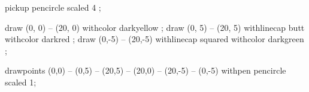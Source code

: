 \startMPpage[offset=1dk]

    pickup pencircle scaled 4 ;

    draw (0, 0) -- (20, 0)                     withcolor darkyellow ;
    draw (0, 5) -- (20, 5) withlinecap butt    withcolor darkred ;
    draw (0,-5) -- (20,-5) withlinecap squared withcolor darkgreen ;

    drawpoints (0,0) -- (0,5) -- (20,5) -- (20,0) -- (20,-5) -- (0,-5) withpen pencircle scaled 1;

\stopMPpage
